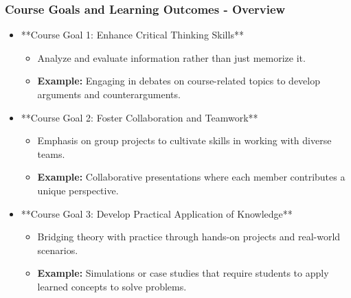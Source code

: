 \documentclass[aspectratio=169]{beamer}
\begin{document}
\begin{frame}[fragile]
    \frametitle{Course Goals and Learning Outcomes - Overview}
    \begin{itemize}
        \item **Course Goal 1: Enhance Critical Thinking Skills**
        \begin{itemize}
            \item Analyze and evaluate information rather than just memorize it.
            \item \textbf{Example:} Engaging in debates on course-related topics to develop arguments and counterarguments.
        \end{itemize}

        \item **Course Goal 2: Foster Collaboration and Teamwork**
        \begin{itemize}
            \item Emphasis on group projects to cultivate skills in working with diverse teams.
            \item \textbf{Example:} Collaborative presentations where each member contributes a unique perspective.
        \end{itemize}

        \item **Course Goal 3: Develop Practical Application of Knowledge**
        \begin{itemize}
            \item Bridging theory with practice through hands-on projects and real-world scenarios.
            \item \textbf{Example:} Simulations or case studies that require students to apply learned concepts to solve problems.
        \end{itemize}
    \end{itemize}
\end{frame}
\end{document}
